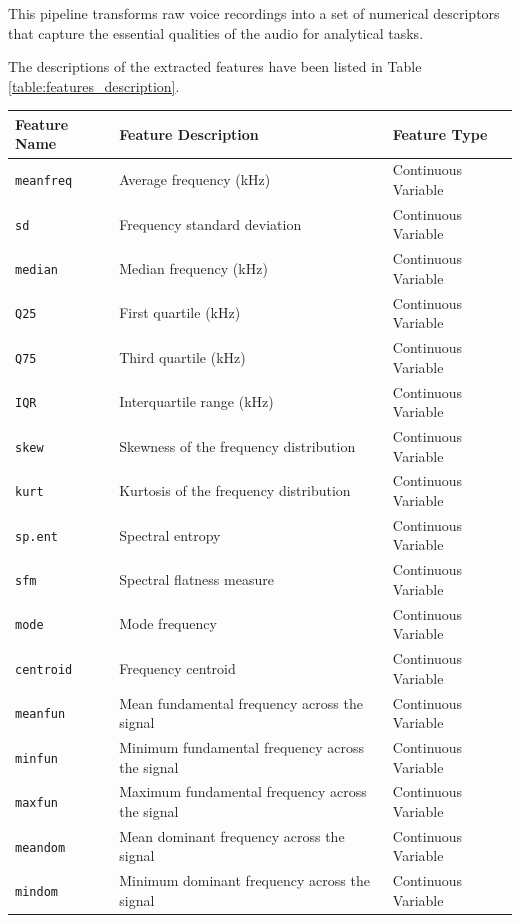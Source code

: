 \documentclass{article}
\begin{document}
	This pipeline transforms raw voice recordings into a set of numerical descriptors that capture the essential qualities of the audio for analytical tasks.
	
	The descriptions of the extracted features have been listed in Table \ref{table:features_description}.
	
	{
		\renewcommand{\arraystretch}{1.3}
		\begin{table}
			\centering
			\begin{tabular}{lll}
				\hline
				\textbf{Feature Name} & \textbf{Feature Description} & \textbf{Feature Type} \\
				\hline
				\texttt{meanfreq} & Average frequency (kHz) & Continuous Variable \\
				\texttt{sd} & Frequency standard deviation & Continuous Variable \\
				\texttt{median} & Median frequency (kHz) & Continuous Variable \\
				\texttt{Q25} & First quartile (kHz) & Continuous Variable \\
				\texttt{Q75} & Third quartile (kHz) & Continuous Variable \\
				\texttt{IQR} & Interquartile range (kHz) & Continuous Variable \\
				\texttt{skew} & Skewness of the frequency distribution & Continuous Variable \\
				\texttt{kurt} & Kurtosis of the frequency distribution & Continuous Variable \\
				\texttt{sp.ent} & Spectral entropy & Continuous Variable \\
				\texttt{sfm} & Spectral flatness measure & Continuous Variable \\
				\texttt{mode} & Mode frequency & Continuous Variable \\
				\texttt{centroid} & Frequency centroid & Continuous Variable \\
				\texttt{meanfun} & Mean fundamental frequency across the signal & Continuous Variable \\
				\texttt{minfun} & Minimum fundamental frequency across the signal & Continuous Variable \\
				\texttt{maxfun} & Maximum fundamental frequency across the signal & Continuous Variable \\
				\texttt{meandom} & Mean dominant frequency across the signal & Continuous Variable \\
				\texttt{mindom} & Minimum dominant frequency across the signal & Continuous Variable \\

\end{tabular}
\end{table}}
\end{document}
